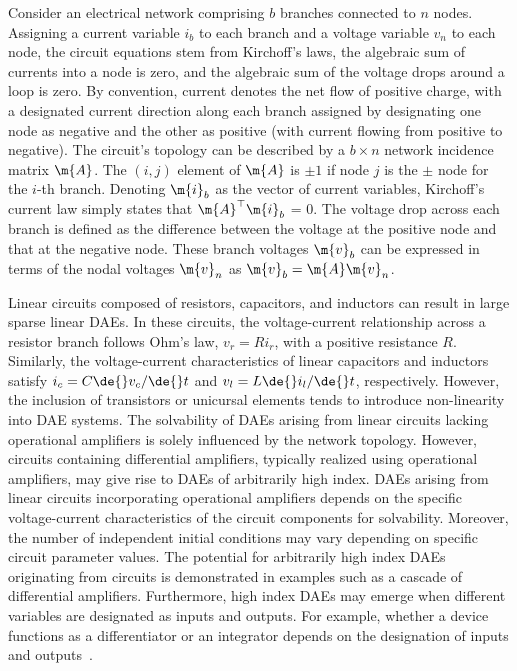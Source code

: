 Consider an electrical network comprising $b$ branches connected to $n$ nodes. Assigning a current variable $i_b$ to each branch and a voltage variable $v_n$ to each node, the circuit equations stem from Kirchoff's laws, \ie{} the algebraic sum of currents into a node is zero, and the algebraic sum of the voltage drops around a loop is zero. By convention, current denotes the net flow of positive charge, with a designated current direction along each branch assigned by designating one node as negative and the other as positive (with current flowing from positive to negative). The circuit's topology can be described by a $b \times n$ network incidence matrix $\m{A}$. The $(i,j)$ element of $\m{A}$ is $\pm1$ if node $j$ is the $\pm$ node for the $i$-th branch. Denoting $\m{i}_b$ as the vector of current variables, Kirchoff's current law simply states that $\m{A}^\top\m{i}_b$ = 0. The voltage drop across each branch is defined as the difference between the voltage at the positive node and that at the negative node. These branch voltages $\m{v}_b$ can be expressed in terms of the nodal voltages $\m{v}_n$ as $\m{v}_b = \m{A}\m{v}_n$.

Linear circuits composed of resistors, capacitors, and inductors can result in large sparse linear \acp{DAE}. In these circuits, the voltage-current relationship across a resistor branch follows Ohm's law, $v_r = Ri_r$, with a positive resistance $R$. Similarly, the voltage-current characteristics of linear capacitors and inductors satisfy $i_c = C\de{}v_c/\de{}t$ and $v_l = L\de{}i_l/\de{}t$, respectively. However, the inclusion of transistors or unicursal elements tends to introduce non-linearity into \ac{DAE} systems. The solvability of \acp{DAE} arising from linear circuits lacking operational amplifiers is solely influenced by the network topology. However, circuits containing differential amplifiers, typically realized using operational amplifiers, may give rise to \acp{DAE} of arbitrarily high index. \acp{DAE} arising from linear circuits incorporating operational amplifiers depends on the specific voltage-current characteristics of the circuit components for solvability. Moreover, the number of independent initial conditions may vary depending on specific circuit parameter values. The potential for arbitrarily high index \acp{DAE} originating from circuits is demonstrated in examples such as a cascade of differential amplifiers. Furthermore, high index \acp{DAE} may emerge when different variables are designated as inputs and outputs. For example, whether a device functions as a differentiator or an integrator depends on the designation of inputs and outputs~\cite{brenan1995numerical}.


